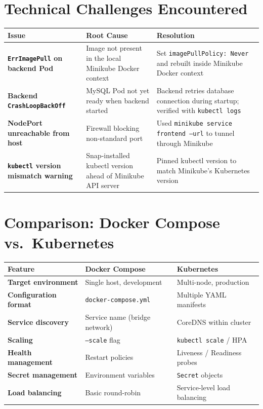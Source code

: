 \documentclass[12pt,a4paper]{article}
\begin{document}
\section{Technical Challenges Encountered}

\begin{center}
\begin{tabular}{>{\bfseries}p{3.5cm} p{4.5cm} p{5cm}}
\toprule
Issue & Root Cause & Resolution \\
\midrule
\texttt{ErrImagePull} on backend Pod
  & Image not present in the local Minikube Docker context
  & Set \texttt{imagePullPolicy: Never} and rebuilt inside Minikube Docker context \\
\addlinespace
Backend \texttt{CrashLoopBackOff}
  & MySQL Pod not yet ready when backend started
  & Backend retries database connection during startup; verified with \texttt{kubectl logs} \\
\addlinespace
NodePort unreachable from host
  & Firewall blocking non-standard port
  & Used \texttt{minikube service frontend --url} to tunnel through Minikube \\
\addlinespace
\texttt{kubectl} version mismatch warning
  & Snap-installed kubectl version ahead of Minikube API server
  & Pinned kubectl version to match Minikube's Kubernetes version \\
\bottomrule
\end{tabular}
\end{center}

\section{Comparison: Docker Compose vs.\ Kubernetes}

\begin{center}
\begin{tabular}{>{\bfseries}p{3.5cm} p{4.5cm} p{4.5cm}}
\toprule
Feature & Docker Compose & Kubernetes \\
\midrule
Target environment & Single host, development & Multi-node, production \\
Configuration format & \texttt{docker-compose.yml} & Multiple YAML manifests \\
Service discovery & Service name (bridge network) & CoreDNS within cluster \\
Scaling & \texttt{--scale} flag & \texttt{kubectl scale} / HPA \\
Health management & Restart policies & Liveness / Readiness probes \\
Secret management & Environment variables & \texttt{Secret} objects \\
Load balancing & Basic round-robin & Service-level load balancing \\
\bottomrule
\end{tabular}
\end{center}
\end{document}
